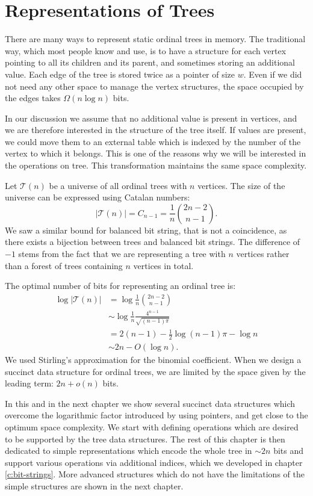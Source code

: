 \chapter{Representations of Trees}

There are many ways to represent static ordinal trees in memory.
The traditional way, which most people know and use, is to have a structure for each vertex pointing to all its children and its parent, and sometimes storing an additional value.
Each edge of the tree is stored twice as a pointer of size $w$.
Even if we did not need any other space to manage the vertex structures, the space occupied by the edges takes $\Omega (n \log n)$ bits.

In our discussion we assume that no additional value is present in vertices, and we are therefore interested in the structure of the tree itself.
If values are present, we could move them to an external table which is indexed by the number of the vertex to which it belongs.
This is one of the reasons why we will be interested in the \anyRank{} operations on tree.
This transformation maintains the same space complexity.

Let $\mathcal{T}(n)$ be a universe of all ordinal trees with $n$ vertices.
The size of the universe can be expressed using Catalan numbers:
$$ | \mathcal{T}(n) | = C_{n-1} = \frac{1}{n} {2n - 2 \choose n - 1}. $$
We saw a similar bound for balanced bit string, that is not a coincidence, as there exists a bijection between trees and balanced bit strings.
The difference of $-1$ stems from the fact that we are representing a tree with $n$ vertices rather than a forest of trees containing $n$ vertices in total.

The optimal number of bits for representing an ordinal tree is:
\begin{align*}
	\log | \mathcal{T}(n) | &= \log \frac{1}{n} {2n - 2 \choose n - 1} \\
	&\sim \log \frac{1}{n}\frac{4^{n-1}}{\sqrt{(n-1)\pi}} \\
	&= 2(n - 1) - \frac{1}{2} \log{(n - 1)\pi} - \log n \\
	&\sim 2n - O(\log n).
\end{align*}
We used Stirling's approximation for the binomial coefficient.
When we design a succinct data structure for ordinal trees, we are limited by the space given by the leading term: $2n + o(n)$ bits.

In this and in the next chapter we show several succinct data structures which overcome the logarithmic factor introduced by using pointers, and get close to the optimum space complexity.
We start with defining operations which are desired to be supported by the tree data structures.
The rest of this chapter is then dedicated to simple representations which encode the whole tree in $\sim 2n$ bits and support various operations via additional indices, which we developed in chapter \ref{c:bit-strings}.
More advanced structures which do not have the limitations of the simple structures are shown in the next chapter.

